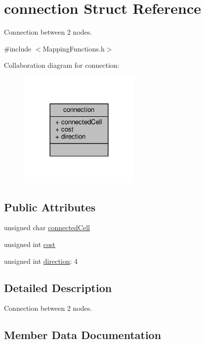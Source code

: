 \hypertarget{structconnection}{}\section{connection Struct Reference}
\label{structconnection}


Connection between 2 nodes.  




{\ttfamily \#include $<$Mapping\+Functions.\+h$>$}



Collaboration diagram for connection\+:
\nopagebreak
\begin{figure}[H]
\begin{center}
\leavevmode
\includegraphics[width=168pt]{structconnection__coll__graph}
\end{center}
\end{figure}
\subsection*{Public Attributes}
\begin{DoxyCompactItemize}
\item 
unsigned char \hyperlink{structconnection_a6c513f2e6b4ed5478a219c1696124518}{connected\+Cell}
\item 
unsigned int \hyperlink{structconnection_a41c58f8db339b3e05c9d459170128eb3}{cost}
\item 
unsigned int \hyperlink{structconnection_a8e2347a2c150b409cbfea1cbd02c031b}{direction}\+: 4
\end{DoxyCompactItemize}


\subsection{Detailed Description}
Connection between 2 nodes. 

\subsection{Member Data Documentation}
\mbox{\label{structconnection_a6c513f2e6b4ed5478a219c1696124518}} 
